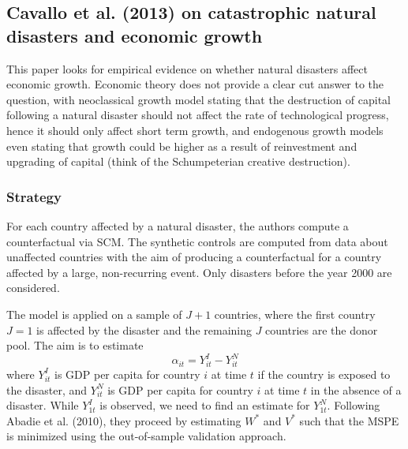 \documentclass[12pt,a4paper,draft]{article}
\begin{document}
\subsection{Cavallo et al. (2013) on catastrophic natural disasters and economic growth}
This paper looks for empirical evidence on whether natural disasters affect economic growth.
Economic theory does not provide a clear cut answer to the question, with neoclassical 
growth model stating that the destruction of capital following a natural disaster should 
not affect the rate of technological progress, hence it should only affect short term 
growth, and endogenous growth models even stating that growth could be higher as a result 
of reinvestment and upgrading of capital (think of the Schumpeterian creative destruction).

\subsubsection{Strategy}
For each country affected by a natural disaster, the authors compute a counterfactual 
via SCM. The synthetic controls are computed from data about unaffected countries with 
the aim of producing a counterfactual for a country affected by a large, non-recurring 
event. Only disasters before the year 2000 are considered.

The model is applied on a sample of $J+1$ countries, where the first country $J=1$ is 
affected by the disaster and the remaining $J$ countries are the donor pool. The aim is 
to estimate $$\alpha_{it} = Y^I_{it} - Y^N_{it}$$ where $Y^I_{it}$ is GDP per capita 
for country $i$ at time $t$ if the country is exposed to the disaster, and $Y^N_{it}$ 
is GDP per capita for country $i$ at time $t$ in the absence of a disaster. 
While $Y^I_{1t}$ is observed, we need to find an estimate for $Y^N_{1t}$. 
Following Abadie et al. (2010), they proceed by estimating $W^*$ and $V^*$ such that 
the MSPE is minimized using the out-of-sample validation approach. 
\end{document}
